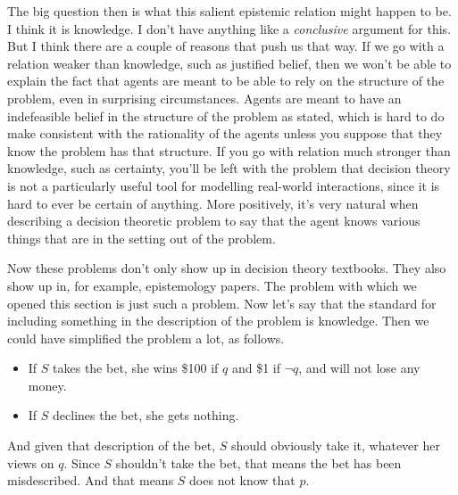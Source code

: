 {The big question then is what this salient epistemic relation might happen to be. I think it is knowledge. I don't have anything like a \textit{conclusive} argument for this. But I think there are a couple of reasons that push us that way. If we go with a relation weaker than knowledge, such as justified belief, then we won't be able to explain the fact that agents are meant to be able to rely on the structure of the problem, even in surprising circumstances. Agents are meant to have an indefeasible belief in the structure of the problem as stated, which is hard to do make consistent with the rationality of the agents unless you suppose that they know the problem has that structure. If you go with relation much stronger than knowledge, such as certainty, you'll be left with the problem that decision theory is not a particularly useful tool for modelling real-world interactions, since it is hard to ever be certain of anything. More positively, it's very natural when describing a decision theoretic problem to say that the agent knows various things that are in the setting out of the problem.

Now these problems don't only show up in decision theory textbooks. They also show up in, for example, epistemology papers. The problem with which we opened this section is just such a problem. Now let's say that the standard for including something in the description of the problem is knowledge. Then we could have simplified the problem a lot, as follows.

\begin{itemize}
\item If \(S\) takes the bet, she wins \$100 if \(q\) and \$1 if \(\neg q\), and will not lose any money.
\item If \(S\) declines the bet, she gets nothing.
\end{itemize}

\noindent And given that description of the bet, \(S\) should obviously take it, whatever her views on \(q\). Since \(S\) shouldn't take the bet, that means the bet has been misdescribed. And that means \(S\) does not know that \(p\).}